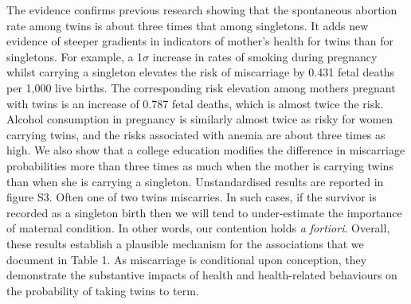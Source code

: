\documentclass[11pt]{article}
\begin{document}
The evidence confirms previous research showing that the spontaneous abortion rate among twins is about three times that among singletons\cite{Boklage1990}. It adds new evidence of steeper gradients in indicators of mother's health for twins than for singletons. For example, a 1$\sigma$ increase in rates of smoking during pregnancy whilst carrying a singleton elevates the risk of miscarriage by 0.431 fetal deaths per 1,000 live births. The corresponding risk elevation among mothers pregnant with twins is an increase of 0.787 fetal deaths, which is almost twice the risk. Alcohol consumption in pregnancy is similarly almost twice as risky for women carrying twins, and the risks associated with anemia are about three times as high. We also show that a college education modifies the difference in miscarriage probabilities more than three times as much when the mother is carrying twins than when she is carrying a singleton.  Unstandardised results are reported in figure S3. Often one of two twins miscarries. In such cases, if the survivor is recorded as a singleton birth then we will tend to under-estimate the importance of maternal condition. In other words, our contention holds \emph{a fortiori}.  %
Overall, these results establish a plausible mechanism for the associations that we document in Table 1. As miscarriage is conditional upon conception, they demonstrate the substantive impacts of health and health-related behaviours on the probability of taking twins to term. %
\end{document}
